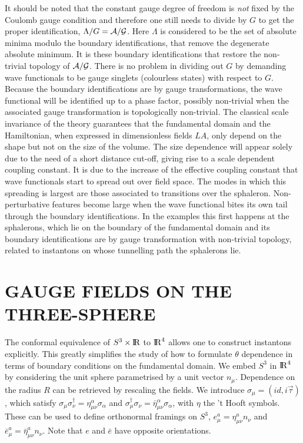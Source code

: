 \documentclass[12pt]{book}
\newcommand{\real}{\relax{\rm I\kern-.18em R}}
\newcommand{\id}{\mbox{$id$}}
\newcommand{\sgbar}{\sg^\dagger}
\newcommand{\al}{\alpha}
\newcommand{\Lm}{\Lambda}
\newcommand{\sg}{\sigma}
\newcommand{\site}[1]{\refnote{\cite{#1}}}
\begin{document}
It should be noted that the constant gauge degree of freedom is {\em not} 
fixed by the Coulomb gauge condition and therefore one still needs to divide 
by $G$ to get the proper identification, $\Lm/G=\cal{A}/\cal{G}$.
Here $\Lm$ is considered to be the set of absolute minima modulo
the boundary identifications, that remove the degenerate absolute minimum.
It is these boundary identifications that restore the non-trivial topology 
of $\cal{A}/\cal{G}$. There is no problem in dividing out $G$ by
demanding wave functionals to be gauge singlets (colourless states)
with respect to $G$. Because the boundary identifications are by gauge 
transformations, the wave functional will be identified up to a phase factor,
possibly non-trivial when the associated gauge transformation is topologically
non-trivial. The classical scale invariance of the theory guarantees that 
the fundamental domain and the Hamiltonian, when expressed in dimensionless
fields $LA$, only depend on the shape but not on the size of the volume. 
The size dependence will appear solely due to the need of a short distance 
cut-off, giving rise to a scale dependent coupling constant. It is due to
the increase of the effective coupling constant that wave functionals start
to spread out over field space. The modes in which this spreading is largest 
are those associated to transitions over the sphaleron. Non-perturbative 
features become large when the wave functional bites its own tail through the 
boundary identifications. In the examples this first happens at the 
sphalerons, which lie on the boundary of the fundamental domain and its 
boundary identifications are by gauge transformation with non-trivial topology, 
related to instantons on whose tunnelling path the sphalerons lie.

\section{GAUGE FIELDS ON THE THREE-SPHERE}
The conformal equivalence of $S^3\times\real$ to $\real^4$ allows one to 
construct instantons explicitly\site{vbda}. This greatly simplifies the study 
of how to formulate $\theta$ dependence in terms of boundary conditions on 
the fundamental domain\site{vbvd}.
We embed $S^3$ in $\real^4$ by considering the unit sphere parametrised by a 
unit vector $n_\mu$. Dependence on the radius $R$ can be retrieved by rescaling
the fields. We introduce $\sg_\mu=(\id,i\vec{\tau})$, which satisfy $\sg_\mu
\sgbar_\nu=\eta^\al_{\mu \nu}\sg_\al$ and $\sgbar_\mu\sg_\nu=\bar{\eta}^\al_{\mu
\nu}\sg_\al$, with $\eta$ the 't Hooft symbols\site{thoo}. These can be used to
define orthonormal framings on $S^3$, $e^a_\mu=\eta^a_{\mu\nu}n_\nu$ and $\bar{
e}^a_\mu=\bar{\eta}^a_{\mu \nu}n_\nu$. Note that $e$ and $\bar{e}$ have opposite
orientations. 
\end{document}
